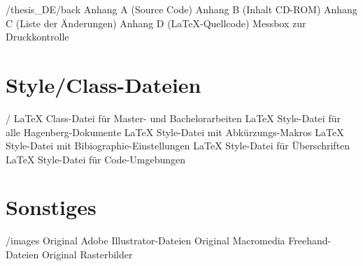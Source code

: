 \begin{FileList}{/thesis_DE/back}
 Anhang A (Source Code) %
 Anhang B (Inhalt CD-ROM) %
 Anhang C (Liste der Änderungen) %
 Anhang D (LaTeX-Quellcode) %
 Messbox zur Druckkontrolle %
\end{FileList}

\section{Style/Class-Dateien}

\begin{FileList}{/}
 LaTeX Class-Datei für Master- und Bachelorarbeiten
 LaTeX Style-Datei für alle Hagenberg-Dokumente
 LaTeX Style-Datei mit Abkürzungs-Makros
 LaTeX Style-Datei mit Bibiographie-Einstellungen
 LaTeX Style-Datei für Überschriften
 LaTeX Style-Datei für Code-Umgebungen
\end{FileList}


\section{Sonstiges}

\begin{FileList}{/images}
 Original Adobe Illustrator-Dateien %
 Original Macromedia Freehand-Dateien %
 Original Rasterbilder %
\end{FileList}
